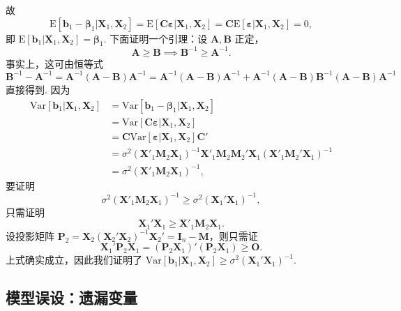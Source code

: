 \documentclass{article}
\newcommand{\E}{\mathrm{E}}
\newcommand{\Var}{\mathrm{Var}}
\newcommand{\X}{\mathbf{X}}
\newcommand{\M}{\mathbf{M}}
\newcommand{\0}{\mathbf{0}}
\newcommand{\vbe}{\bm{\beta}}
\newcommand{\vep}{\bm{\varepsilon}}
\newcommand{\vb}{\mathbf{b}}
\begin{document}
故
\[
\E[\vb_1-\vbe_1|\X_1,\X_2]=\E[\mathbf{C}\vep|\X_1,\X_2]=\mathbf{C}\E[\vep|\X_1,\X_2]=0,
\]
即 $\E[\vb_1|\X_1,\X_2]=\vbe_1$. 下面证明一个引理：设 $\mathbf{A},\mathbf{B}$ 正定，
\[
\mathbf{A}\ge\mathbf{B}\implies\mathbf{B}^{-1}\ge\mathbf{A}^{-1}.
\]
事实上，这可由恒等式
\[
\mathbf{B}^{-1}-\mathbf{A}^{-1} = \mathbf{A}^{-1}(\mathbf{A}-\mathbf{B})\mathbf{A}^{-1}
=\mathbf{A}^{-1}(\mathbf{A}-\mathbf{B})\mathbf{A}^{-1} + \mathbf{A}^{-1}(\mathbf{A}-\mathbf{B})\mathbf{B}^{-1}(\mathbf{A}-\mathbf{B})\mathbf{A}^{-1}
\]
直接得到. 因为
\begin{align*}
\Var[\vb_1|\X_1,\X_2]&=\Var[\vb_1-\vbe_1|\X_1,\X_2]\\
&=\Var[\mathbf{C}\vep|\X_1,\X_2]\\
&=\mathbf{C}\Var[\vep|\X_1,\X_2]\mathbf{C}'\\
&=\sigma^2(\X'_1\M_2\X_1)^{-1}\X'_1\M_2\M_2'\X_1(\X'_1\M_2'\X_1)^{-1}\\
&=\sigma^2(\X'_1\M_2\X_1)^{-1},
\end{align*}
要证明
\[
\sigma^2(\X'_1\M_2\X_1)^{-1}\ge\sigma^2(\X_1'\X_1)^{-1},
\]
只需证明
\[
\X_1'\X_1\ge\X'_1\M_2\X_1.
\]
设投影矩阵 $\mathbf{P}_2=\X_2(\X_2'\X_2)^{-1}\X_2'=\mathbf{I}_n-\M$，则只需证
\[
\X_1'\mathbf{P}_2\X_1=(\mathbf{P}_2\X_1)'(\mathbf{P}_2\X_1)\ge\mathbf{O}.
\]
上式确实成立，因此我们证明了 $\Var[\vb_1|\X_1,\X_2]\ge\sigma^2(\X_1'\X_1)^{-1}$.

\subsection{模型误设：遗漏变量}
\end{document}
